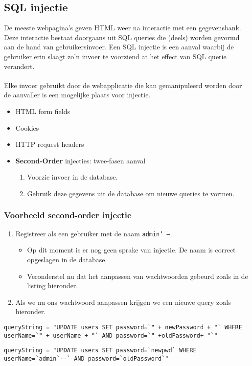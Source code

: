 \documentclass[../main.tex]{subfiles}
\begin{document}
\subsection{SQL injectie}
De meeste webpagina's geven HTML weer na interactie met een gegevensbank. Deze interactie bestaat doorgaans uit SQL queries die (deels) worden gevormd aan de hand van gebruikersinvoer. Een SQL injectie is een aanval waarbij de gebruiker erin slaagt zo'n invoer te voorziend at het effect van SQL querie verandert. 
\\\\
Elke invoer gebruikt door de webapplicatie die kan gemanipuleerd worden door de aanvaller is een mogelijke plaats voor injectie.
\begin{itemize}
	\item HTML form fields
	\item Cookies
	\item HTTP request headers
	\item \textbf{Second-Order} injecties: twee-fasen aanval
	\begin{enumerate}
		\item Voorzie invoer in de database.
		\item Gebruik deze gegevens uit de database om nieuwe queries te vormen.	
	\end{enumerate}
\end{itemize}

\subsubsection{Voorbeeld second-order injectie}
\begin{enumerate}
	\item Registreer als een gebruiker met de naam \texttt{admin' --}.
	\begin{itemize}
		\item Op dit moment is er nog geen sprake van injectie. De naam is correct opgeslagen in de database.
		\item Veronderstel nu dat het aanpassen van wachtwoorden gebeurd zoals in de listing hieronder.
	\end{itemize}
	\item Als we nu ons wachtwoord aanpassen krijgen we een nieuwe query zoals hieronder.
\end{enumerate}
\begin{lstlisting}[caption=Updaten wachtwoord]
queryString = "UPDATE users SET password=`" + newPassword + "` WHERE userName=`" + userName + "` AND password=`" +oldPassword+ "`"
\end{lstlisting}
\begin{lstlisting}[caption=SQL Injection]
queryString = "UPDATE users SET password=`newpwd` WHERE userName=`admin`--` AND password=`oldPassword`"
\end{lstlisting}
\end{document}
